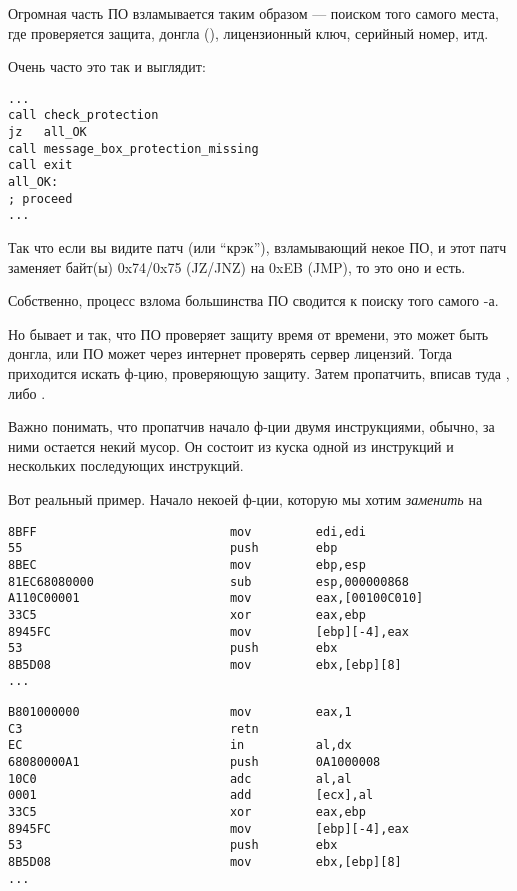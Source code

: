 \myindex{\SoftwareCracking}

Огромная часть ПО взламывается таким образом --- поиском того самого места, где проверяется защита, донгла (),
лицензионный ключ, серийный номер, итд.

Очень часто это так и выглядит:

\begin{lstlisting}[style=customasmx86]
...
call check_protection
jz   all_OK
call message_box_protection_missing
call exit
all_OK:
; proceed
...
\end{lstlisting}

Так что если вы видите патч (или ``крэк''), взламывающий некое ПО,
и этот патч заменяет байт(ы) 0x74/0x75 (JZ/JNZ) на 0xEB (JMP), то это оно и есть.

Собственно, процесс взлома большинства ПО сводится к поиску того самого -а.

\myhrule{}

Но бывает и так, что ПО проверяет защиту время от времени, это может быть донгла,
или ПО может через интернет проверять сервер лицензий.
Тогда приходится искать ф-цию, проверяющую защиту.
Затем пропатчить, вписав туда , либо .

Важно понимать, что пропатчив начало ф-ции двумя инструкциями, обычно, за ними остается некий мусор.
Он состоит из куска одной из инструкций и нескольких последующих инструкций.

Вот реальный пример.
Начало некоей ф-ции, которую мы хотим \emph{заменить} на 

\begin{lstlisting}[style=customasmx86,caption=Было]
8BFF                           mov         edi,edi
55                             push        ebp
8BEC                           mov         ebp,esp
81EC68080000                   sub         esp,000000868
A110C00001                     mov         eax,[00100C010]
33C5                           xor         eax,ebp
8945FC                         mov         [ebp][-4],eax
53                             push        ebx
8B5D08                         mov         ebx,[ebp][8]
...
\end{lstlisting}

\begin{lstlisting}[style=customasmx86,caption=Стало]
B801000000                     mov         eax,1
C3                             retn
EC                             in          al,dx
68080000A1                     push        0A1000008
10C0                           adc         al,al
0001                           add         [ecx],al
33C5                           xor         eax,ebp
8945FC                         mov         [ebp][-4],eax
53                             push        ebx
8B5D08                         mov         ebx,[ebp][8]
...
\end{lstlisting}

